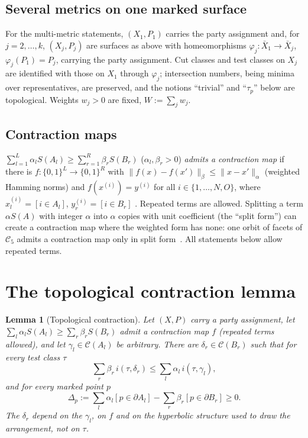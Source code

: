 \documentclass[aps,prd,onecolumn,superscriptaddress,nofootinbib,amsmath,amssymb,11pt]{revtex4-2}
\newtheorem{lemma}[theorem]{Lemma}
\theoremstyle{definition}
\newcommand{\Cut}{\mathcal{C}}
\begin{document}
\subsection{Several metrics on one marked surface}

For the multi-metric statements, $(X_1,P_1)$ carries the party assignment and, for $j=2,\dots,k$, $(X_j,P_j)$ are
surfaces as above with homeomorphisms $\varphi_j:\bar X_1\to\bar X_j$, $\varphi_j(P_1)=P_j$, carrying the party
assignment. Cut classes and test classes on $X_j$ are identified with those on $X_1$ through $\varphi_j$;
intersection numbers, being minima over representatives, are preserved, and the notions ``trivial'' and
``$\tau_p$'' below are topological. Weights $w_j>0$ are fixed, $W:=\sum_jw_j$.

\subsection{Contraction maps}

$\sum_{l=1}^L\alpha_lS(A_l)\ge\sum_{r=1}^R\beta_rS(B_r)$ ($\alpha_l,\beta_r>0$) \emph{admits a contraction map}
if there is $f:\{0,1\}^L\to\{0,1\}^R$ with $\|f(x)-f(x')\|_\beta\le\|x-x'\|_\alpha$ (weighted Hamming norms) and
$f(x^{(i)})=y^{(i)}$ for all $i\in\{1,\dots,N,O\}$, where $x^{(i)}_l=[i\in A_l]$, $y^{(i)}_r=[i\in B_r]$
\cite{Bao2015}. Repeated terms are allowed. Splitting a term $\alpha S(A)$ with integer $\alpha$ into $\alpha$
copies with unit coefficient (the ``split form'') can create a contraction map where the weighted form has none:
one orbit of facets of $\mathcal{C}_5$ admits a contraction map only in split
form~\cite{AvisHernandezCuenca2023,GHHS2026}. All statements below allow repeated terms.

\section{The topological contraction lemma}\label{sec:lemmaA}

\begin{lemma}[Topological contraction]\label{lem:A}
Let $(X,P)$ carry a party assignment, let $\sum_l\alpha_lS(A_l)\ge\sum_r\beta_rS(B_r)$ admit a contraction map
$f$ (repeated terms allowed), and let $\gamma_l\in\Cut(A_l)$ be arbitrary. There are $\delta_r\in\Cut(B_r)$
such that for every test class $\tau$
\begin{equation}\label{eq:A1}
\sum_r\beta_r\,i(\tau,\delta_r)\le\sum_l\alpha_l\,i(\tau,\gamma_l),
\end{equation}
and for every marked point $p$
\begin{equation}\label{eq:A2}
\Delta_p:=\sum_l\alpha_l[p\in\partial A_l]-\sum_r\beta_r[p\in\partial B_r]\ge0.
\end{equation}
The $\delta_r$ depend on the $\gamma_l$, on $f$ and on the hyperbolic structure used to draw the arrangement,
not on $\tau$.
\end{lemma}
\end{document}
